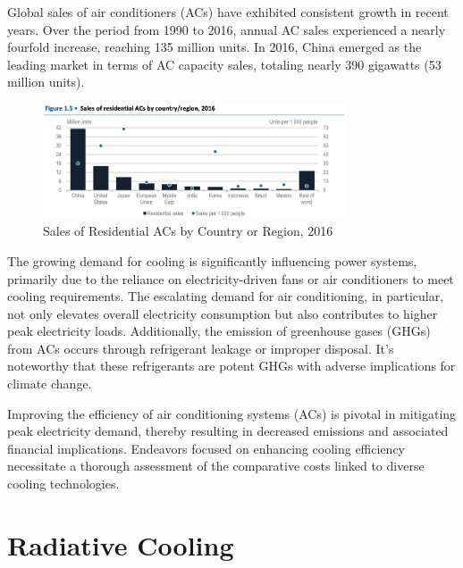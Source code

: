 Global sales of air conditioners (ACs) have exhibited consistent growth in recent years. Over the period from 1990 to 2016, annual AC sales experienced a nearly fourfold increase, reaching 135 million units. In 2016, China emerged as the leading market in terms of AC capacity sales, totaling nearly 390 gigawatts (53 million units). %

\begin{figure}
  \centering
  \includegraphics[width=0.8\textwidth]{Chapters/Figures/Sales of Residential ACs by Country or Region, 2016.jpg}
  \caption{Sales of Residential ACs by Country or Region, 2016}
\end{figure}

The growing demand for cooling is significantly influencing power systems, primarily due to the reliance on electricity-driven fans or air conditioners to meet cooling requirements. The escalating demand for air conditioning, in particular, not only elevates overall electricity consumption but also contributes to higher peak electricity loads. Additionally, the emission of greenhouse gases (GHGs) from ACs occurs through refrigerant leakage or improper disposal. It's noteworthy that these refrigerants are potent GHGs with adverse implications for climate change. %

Improving the efficiency of air conditioning systems (ACs) is pivotal in mitigating peak electricity demand, thereby resulting in decreased emissions and associated financial implications. Endeavors focused on enhancing cooling efficiency necessitate a thorough assessment of the comparative costs linked to diverse cooling technologies. %

\section{Radiative Cooling}


